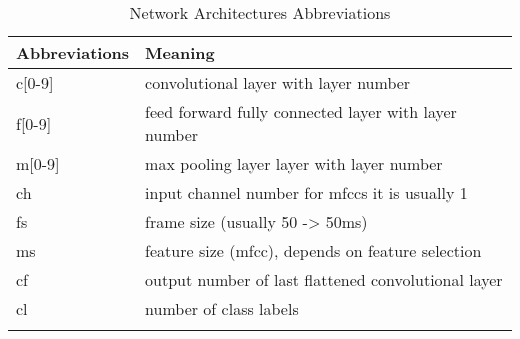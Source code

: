 \begin{table}[ht!]
\begin{center}
\caption{Network Architectures Abbreviations}
\begin{tabular}{ M{2.5cm}  M{10cm} }
\toprule
\textbf{Abbreviations} & \textbf{Meaning}\\
\midrule
c[0-9] & convolutional layer with layer number\\
f[0-9] & feed forward fully connected layer with layer number\\
m[0-9] & max pooling layer layer with layer number\\
ch & input channel number for mfccs it is usually 1\\
fs & frame size (usually 50 -> 50ms)\\
ms & feature size (mfcc), depends on feature selection\\
cf & output number of last flattened convolutional layer\\
cl & number of class labels\\
\bottomrule
\label{tab:nn_arch_abbreviation}
\end{tabular}
\end{center}
\end{table}
\FloatBarrier
\noindent
